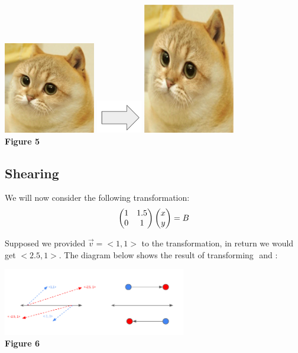 \documentclass{article}
\begin{document}
\begin{center}
	\includegraphics[width=4cm]{cate-original.jpg}
	\includegraphics[width=2cm]{r-arrow.png}
	\includegraphics[width=4cm]{cate-scaled.jpg}\\
	\textbf{Figure 5}
\end{center}

\subsection {Shearing}
\par \noindent We will now consider the following transformation:
\[
\left(\begin{array}{@{}cc@{}}
	1 & 1.5 \\
	0 & 1\\
\end{array}\right)
\left(\begin{array}{@{}c@{}}
	x \\
	y \\
\end{array}\right)= B
\]

\par \noindent Supposed we provided \(\vec v = <1,1>\) to the transformation, in return we would get \(<2.5,1>\). The diagram below shows the result of transforming \(<1,1>\) and \(<-1,-1>\):

\begin{center}
	\includegraphics[width=8cm]{shear.png}\\
	\textbf{Figure 6}
\end{center}
\end{document}
